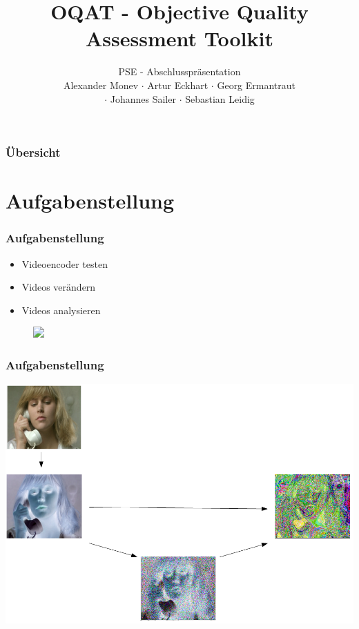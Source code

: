 \documentclass[t]{beamer}
\title{OQAT - Objective Quality Assessment Toolkit}
\subtitle{PSE - Abschlusspräsentation \\[0.3cm]
Alexander Monev $\cdot$ Artur Eckhart $\cdot$ Georg Ermantraut\\ $\cdot$ Johannes Sailer  $\cdot$ Sebastian
Leidig}
\institute[ITEC]{Institut für Technische Informatik}
\begin{document}
\begin{frame}
	\maketitle
\end{frame}

\begin{frame}
	\frametitle{Übersicht}
	\tableofcontents
\end{frame}

\section{Aufgabenstellung}

\begin{frame}
	\frametitle{Aufgabenstellung}
	
		
			\begin{itemize}
				\item <+-> Videoencoder testen
				\item <+-> Videos verändern
				\item <+-> Videos analysieren
			\end{itemize}
			\begin{figure}
				\includegraphics<4->[scale=.45]{img/aufgabe.png}
			\end{figure}
		
				

\end{frame}
\begin{frame}
	\frametitle{Aufgabenstellung}
	\begin{center}
		\vspace*{\fill}
		\includegraphics[scale=.35]{img/aufgabe2.png}
		\vspace*{\fill} ~\\
	\end{center}
\end{frame}
\end{document}
